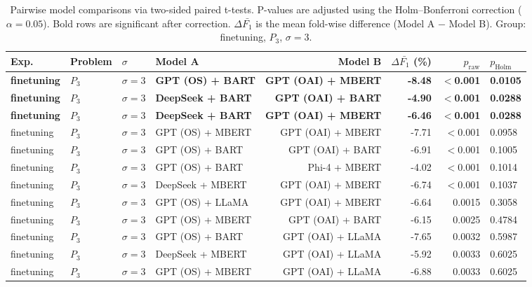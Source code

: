 \begin{table}[htbp]
\centering
\caption{Pairwise model comparisons via two-sided paired t-tests. P-values are adjusted using the Holm--Bonferroni correction ($\alpha = 0.05$). Bold rows are significant after correction. $\Delta\bar{F_1}$ is the mean fold-wise difference (Model A $-$ Model B). Group: finetuning, $P_3$, $\sigma{=}3$.}
\label{tab:holm_ttests_finetuning_p3_alpha3}
\begin{tabular*}{\textwidth}{@{\extracolsep{\fill}}llllrrrl}
\hline
\textbf{Exp.} & \textbf{Problem} & \textbf{$\sigma$} & \textbf{Model A} & \textbf{Model B} & \textbf{$\Delta \bar{F_1}$ (\%)} & \textbf{$p_\text{raw}$} & \textbf{$p_\text{Holm}$} \\
\hline
\textbf{finetuning} & \textbf{$P_3$} & \textbf{$\sigma{=}3$} & \textbf{GPT (OS) + BART} & \textbf{GPT (OAI) + MBERT} & \textbf{-8.48} & \textbf{$<$0.001} & \textbf{0.0105} \\
\textbf{finetuning} & \textbf{$P_3$} & \textbf{$\sigma{=}3$} & \textbf{DeepSeek + BART} & \textbf{GPT (OAI) + BART} & \textbf{-4.90} & \textbf{$<$0.001} & \textbf{0.0288} \\
\textbf{finetuning} & \textbf{$P_3$} & \textbf{$\sigma{=}3$} & \textbf{DeepSeek + BART} & \textbf{GPT (OAI) + MBERT} & \textbf{-6.46} & \textbf{$<$0.001} & \textbf{0.0288} \\
finetuning & $P_3$ & $\sigma{=}3$ & GPT (OS) + MBERT & GPT (OAI) + MBERT & -7.71 & $<$0.001 & 0.0958 \\
finetuning & $P_3$ & $\sigma{=}3$ & GPT (OS) + BART & GPT (OAI) + BART & -6.91 & $<$0.001 & 0.1005 \\
finetuning & $P_3$ & $\sigma{=}3$ & GPT (OS) + BART & Phi-4 + MBERT & -4.02 & $<$0.001 & 0.1014 \\
finetuning & $P_3$ & $\sigma{=}3$ & DeepSeek + MBERT & GPT (OAI) + MBERT & -6.74 & $<$0.001 & 0.1037 \\
finetuning & $P_3$ & $\sigma{=}3$ & GPT (OS) + LLaMA & GPT (OAI) + MBERT & -6.64 & 0.0015 & 0.3058 \\
finetuning & $P_3$ & $\sigma{=}3$ & GPT (OS) + MBERT & GPT (OAI) + BART & -6.15 & 0.0025 & 0.4784 \\
finetuning & $P_3$ & $\sigma{=}3$ & GPT (OS) + BART & GPT (OAI) + LLaMA & -7.65 & 0.0032 & 0.5987 \\
finetuning & $P_3$ & $\sigma{=}3$ & DeepSeek + MBERT & GPT (OAI) + LLaMA & -5.92 & 0.0033 & 0.6025 \\
finetuning & $P_3$ & $\sigma{=}3$ & GPT (OS) + MBERT & GPT (OAI) + LLaMA & -6.88 & 0.0033 & 0.6025 \\

\end{tabular*}
\end{table}
